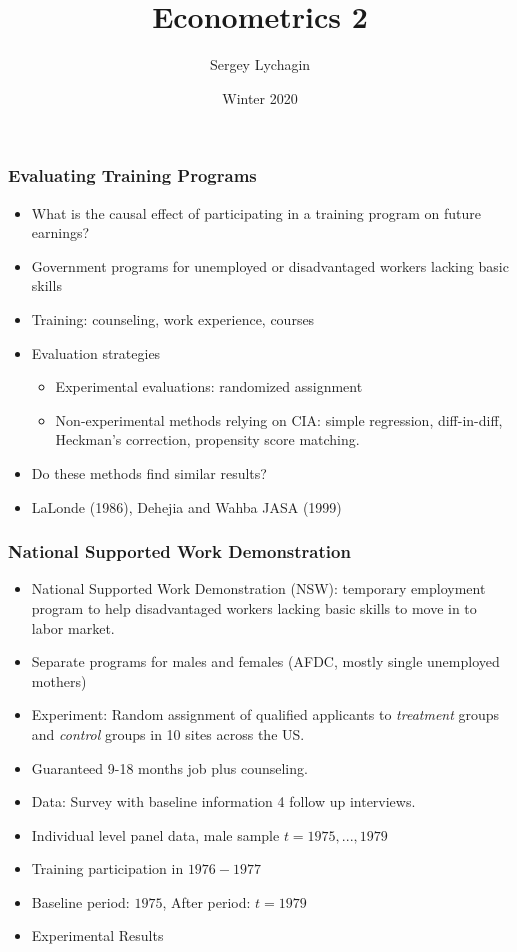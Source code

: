 \documentclass[notes=show,beamer,compress]{beamer}
\title[]{Econometrics 2}
\subtitle{}
\author[Lychagin \& Mu\c{c}o]{Sergey Lychagin}
\institute[CEU]{CEU}
\date{Winter 2020}
\begin{document}
\frame{\titlepage}



\begin{frame}
\frametitle{Evaluating Training Programs}
\begin{itemize}
\item What is the causal effect of participating in a training program on future earnings?
\item Government programs for unemployed or disadvantaged workers lacking basic skills
\item Training: counseling, work experience, courses
\item Evaluation strategies
	\begin{itemize}
		\item Experimental evaluations: randomized assignment
		\item Non-experimental methods relying on CIA: simple regression, diff-in-diff, Heckman's correction, propensity score matching.
	\end{itemize}
\item Do these methods find similar results?
\item LaLonde (1986), Dehejia and Wahba JASA (1999)

\end{itemize}
\end{frame}

\begin{frame}
\frametitle{National Supported Work Demonstration}
\begin{itemize}
\item National Supported Work Demonstration (NSW): temporary employment program to help disadvantaged workers lacking basic skills to move in to labor market.
\item Separate programs for males and females (AFDC, mostly single unemployed mothers)
\item Experiment: Random assignment of qualified applicants  to \emph{treatment} groups and \emph{control} groups in 10 sites across the US.
\item Guaranteed 9-18 months job plus counseling.
\item Data: Survey with baseline information 4 follow up interviews.
\item Individual level panel data, male sample $t=1975, ..., 1979$
\item Training participation in $1976 -1977$
\item Baseline period: $1975$, After period: $t=1979$
\item Experimental Results
\end{itemize}
\end{frame}
\end{document}

